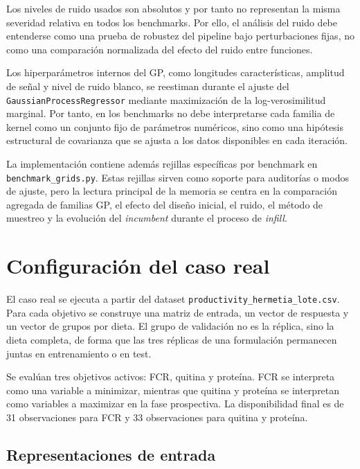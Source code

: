 Los niveles de ruido usados son absolutos y por tanto no representan la misma severidad relativa en todos los benchmarks. Por ello, el análisis del ruido debe entenderse como una prueba de robustez del pipeline bajo perturbaciones fijas, no como una comparación normalizada del efecto del ruido entre funciones.

Los hiperparámetros internos del GP, como longitudes características, amplitud de señal y nivel de ruido blanco, se reestiman durante el ajuste del \texttt{GaussianProcessRegressor} mediante maximización de la log-verosimilitud marginal. Por tanto, en los benchmarks no debe interpretarse cada familia de kernel como un conjunto fijo de parámetros numéricos, sino como una hipótesis estructural de covarianza que se ajusta a los datos disponibles en cada iteración.

La implementación contiene además rejillas específicas por benchmark en 
\texttt{benchmark\_grids.py}. Estas rejillas sirven como soporte para auditorías o modos de ajuste, pero la lectura principal de la memoria se centra en la comparación agregada de familias GP, el efecto del diseño inicial, el ruido, el método de muestreo y la evolución del \emph{incumbent} durante el proceso de \emph{infill}.

\section{Configuración del caso real}
\label{app:configuracion_computacional_caso_real}

El caso real se ejecuta a partir del dataset \texttt{productivity\_hermetia\_lote.csv}. Para cada objetivo se construye una matriz de entrada, un vector de respuesta y un vector de grupos por dieta. El grupo de validación no es la réplica, sino la dieta completa, de forma que las tres réplicas de una formulación permanecen juntas en entrenamiento o en test.

Se evalúan tres objetivos activos: FCR, quitina y proteína. FCR se interpreta como una variable a minimizar, mientras que quitina y proteína se interpretan como variables a maximizar en la fase prospectiva. La disponibilidad final es de 31 observaciones para FCR y 33 observaciones para quitina y proteína.

\subsection{Representaciones de entrada}
\label{app:feature_modes_real_case}

